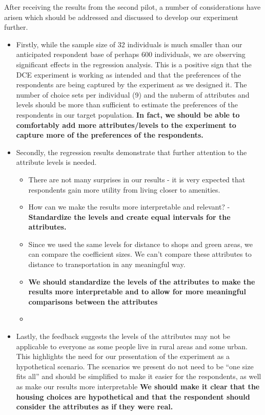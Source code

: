 \documentclass[
]{article}
\providecommand{\tightlist}{%
  \setlength{\itemsep}{0pt}\setlength{\parskip}{0pt}}
\begin{document}
After receiving the results from the second pilot, a number of
considerations have arisen which should be addressed and discussed to
develop our experiment further.

\begin{itemize}
\item
  Firstly, while the sample size of 32 individuals is much smaller than
  our anticipated respondent base of perhaps 600 individuals, we are
  observing significant effects in the regression analysis. This is a
  positive sign that the DCE experiment is working as intended and that
  the preferences of the respondents are being captured by the
  experiment as we designed it. The number of choice sets per individual
  (9) and the nuberm of attributes and levels should be more than
  sufficient to estimate the preferences of the respondents in our
  target population. \textbf{In fact, we should be able to comfortably
  add more attributes/levels to the experiment to capture more of the
  preferences of the respondents.}
\item
  Secondly, the regression results demonstrate that further attention to
  the attribute levels is needed.

  \begin{itemize}
  \tightlist
  \item
    There are not many surprises in our results - it is very expected
    that respondents gain more utility from living closer to amenities.
  \item
    How can we make the results more interpretable and relevant? -
    \textbf{Standardize the levels and create equal intervals for the
    attributes.}
  \item
    Since we used the same levels for distance to shops and green areas,
    we can compare the coefficient sizes. We can't compare these
    attributes to distance to transportation in any meaningful way.
  \item
    \textbf{We should standardize the levels of the attributes to make
    the results more interpretable and to allow for more meaningful
    comparisons between the attributes}
  \item
  \end{itemize}
\item
  Lastly, the feedback suggests the levels of the attributes may not be
  applicable to everyone as some people live in rural areas and some
  urban. This highlights the need for our presentation of the experiment
  as a hypothetical scenario. The scenarios we present do not need to be
  ``one size fits all'' and should be simplified to make it easier for
  the respondents, as well as make our results more interpretable
  \textbf{We should make it clear that the housing choices are
  hypothetical and that the respondent should consider the attributes as
  if they were real.}


\end{itemize}
\end{document}
